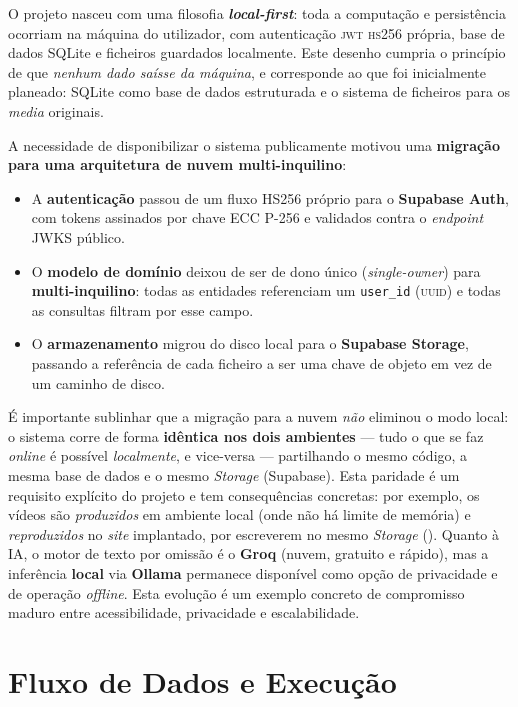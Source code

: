 O projeto nasceu com uma filosofia \textbf{\emph{local-first}}: toda a
computação e persistência ocorriam na máquina do utilizador, com
autenticação \textsc{jwt} \textsc{hs256} própria, base de dados SQLite e
ficheiros guardados localmente. Este desenho cumpria o princípio de que
\emph{nenhum dado saísse da máquina}, e corresponde ao que foi inicialmente
planeado: SQLite como base de dados estruturada e o sistema de ficheiros
para os \emph{media} originais.

A necessidade de disponibilizar o sistema publicamente motivou uma
\textbf{migração para uma arquitetura de nuvem multi-inquilino}:

\begin{itemize}[leftmargin=*]
  \item A \textbf{autenticação} passou de um fluxo HS256 próprio para o
  \textbf{Supabase Auth}, com tokens assinados por chave ECC P-256 e
  validados contra o \emph{endpoint} JWKS público.
  \item O \textbf{modelo de domínio} deixou de ser de dono único
  (\emph{single-owner}) para \textbf{multi-inquilino}: todas as entidades
  referenciam um
  \texttt{user\_id} (\textsc{uuid}) e todas as consultas filtram por esse
  campo.
  \item O \textbf{armazenamento} migrou do disco local para o
  \textbf{Supabase Storage}, passando a referência de cada ficheiro a ser
  uma chave de objeto em vez de um caminho de disco.
\end{itemize}

É importante sublinhar que a migração para a nuvem \emph{não} eliminou o
modo local: o sistema corre de forma \textbf{idêntica nos dois ambientes}
--- tudo o que se faz \emph{online} é possível \emph{localmente}, e
vice-versa --- partilhando o mesmo código, a mesma base de dados e o mesmo
\emph{Storage} (Supabase). Esta paridade é um requisito explícito do
projeto e tem consequências concretas: por exemplo, os vídeos são
\emph{produzidos} em ambiente local (onde não há limite de memória) e
\emph{reproduzidos} no \emph{site} implantado, por escreverem no mesmo
\emph{Storage} (). Quanto à IA, o motor de texto por
omissão é o \textbf{Groq} (nuvem, gratuito e rápido), mas a inferência
\textbf{local} via \textbf{Ollama} permanece disponível como opção de
privacidade e de operação \emph{offline}. Esta evolução é um exemplo
concreto de compromisso maduro entre acessibilidade, privacidade e
escalabilidade.

\section{Fluxo de Dados e Execução}
\label{sec:fluxo}

